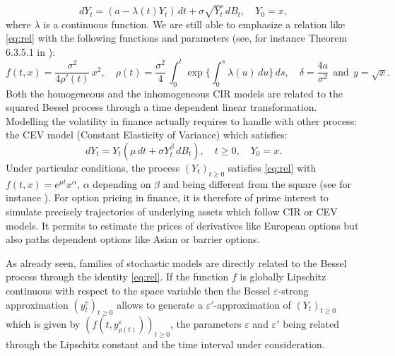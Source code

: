 \documentclass[12pt]{article}
\numberwithin{equation}{section}
\begin{document}
\[
dY_t=(a-\lambda(t)Y_t)\,dt+\sigma \sqrt{Y_t}\,dB_t,\quad Y_0=x,
\]
where $\lambda$ is a continuous function. We are still able to emphasize a relation like \eqref{eq:rel} with the following functions and parameters (see, for instance Theorem 6.3.5.1 in \cite{jeanblanc2009mathematical}):
\[
f(t,x)=\frac{\sigma^2}{4\rho'(t)}\,x^2,\quad \rho(t)=\frac{\sigma^2}{4}\,\int_0^t\exp\Big\{\int_0^s \lambda(u)\,du\Big\}\,ds,\quad \delta=\frac{4a}{\sigma^2}\ \ \mbox{and}\ \  y=\sqrt{x}.
\]
Both the homogeneous and the inhomogeneous CIR models are related to the squared Bessel process through a time dependent linear transformation. Modelling the volatility in finance actually requires to handle with other process: the CEV model (Constant Elasticity of Variance) which satisfies:
\[
dY_t=Y_t(\mu\,dt+\sigma Y_t^{\beta}\,dB_t),\quad t\ge 0,\quad Y_0=x.
\]
Under particular conditions, the process $(Y_t)_{t\ge 0}$ satisfies \eqref{eq:rel} with $f(t,x)=e^{\mu t}x^{\alpha}$, $\alpha$ depending on $\beta$ and being different from the square (see for instance \cite{jeanblanc2009mathematical}). For option pricing in finance, it is therefore of prime interest to simulate precisely trajectories of underlying assets which follow CIR or CEV models. It permits to estimate the prices of derivatives like European options but also paths dependent options like Asian or barrier options.

As already seen, families of stochastic models are directly related to the Bessel process through the identity \eqref{eq:rel}. If the function $f$ is globally Lipschitz continuous with respect to the space variable then the Bessel $\varepsilon$-strong approximation $(y_t^\varepsilon)_{t\ge 0}$ allows to generate a $\varepsilon'$-approximation of $(Y_t)_{t\ge 0}$ which is given by $(f(t,y_{\rho(t)}^\varepsilon))_{t\ge 0}$, the parameters $\varepsilon$ and $\varepsilon'$ being related through the Lipschitz constant and the time interval under consideration. 
\end{document}
